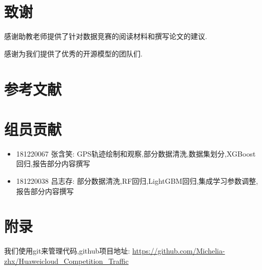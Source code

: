 \documentclass[a4paper,UTF8]{article}
\begin{document}
\section{致谢}
感谢助教老师提供了针对数据竞赛的阅读材料和撰写论文的建议.

感谢为我们提供了优秀的开源模型的团队们.

\section{参考文献}



\section{组员贡献}
\begin{itemize}
	\item 181220067 张含笑: GPS轨迹绘制和观察,部分数据清洗,数据集划分,XGBoost回归,报告部分内容撰写
	\item 181220038 吕志存: 部分数据清洗,RF回归,LightGBM回归,集成学习参数调整,报告部分内容撰写
\end{itemize}

\section{附录}
我们使用git来管理代码,github项目地址: \url{https://github.com/Michelia-zhx/Huaweicloud_Competition_Traffic}
\end{document}
